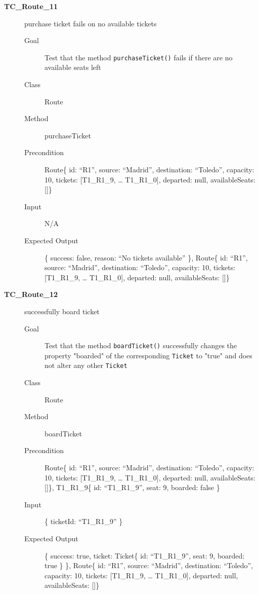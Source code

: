\documentclass[11pt]{article}
\begin{document}
\begin{description}
\item[{\textbf{TC\_Route\_11}}] purchase ticket fails on no available tickets
\begin{description}
\item[{Goal}] Test that the method \texttt{purchaseTicket()} fails if there are no available seats left
\item[{Class}] Route
\item[{Method}] purchaseTicket
\item[{Precondition}] Route\{ id: “R1”, source: “Madrid”, destination: “Toledo”, capacity: 10,  tickets: [T1\_R1\_9, … T1\_R1\_0], departed: null, availableSeats: []\}
\item[{Input}] N/A
\item[{Expected Output}] \{ success: false, reason: “No tickets available” \},
Route\{ id: “R1”, source: “Madrid”, destination: “Toledo”, capacity: 10,  tickets: [T1\_R1\_9, … T1\_R1\_0], departed: null, availableSeats: []\}
\end{description}

\item[{\textbf{TC\_Route\_12}}] successfully board ticket
\begin{description}
\item[{Goal}] Test that the method \texttt{boardTicket()} successfully changes the property "boarded" of the corresponding \texttt{Ticket} to "true" and does not alter any other \texttt{Ticket}
\item[{Class}] Route
\item[{Method}] boardTicket
\item[{Precondition}] Route\{ id: “R1”, source: “Madrid”, destination: “Toledo”, capacity: 10,  tickets: [T1\_R1\_9, … T1\_R1\_0], departed: null, availableSeats: []\}, T1\_R1\_9\{ id: “T1\_R1\_9”, seat: 9, boarded: false \}
\item[{Input}] \{ ticketId: “T1\_R1\_9” \}
\item[{Expected Output}] \{ success: true, ticket:  Ticket\{ id: “T1\_R1\_9”, seat: 9, boarded: true \} \},
Route\{ id: “R1”, source: “Madrid”, destination: “Toledo”, capacity: 10,  tickets: [T1\_R1\_9, … T1\_R1\_0], departed: null, availableSeats: []\}
\end{description}


\end{description}
\end{document}
